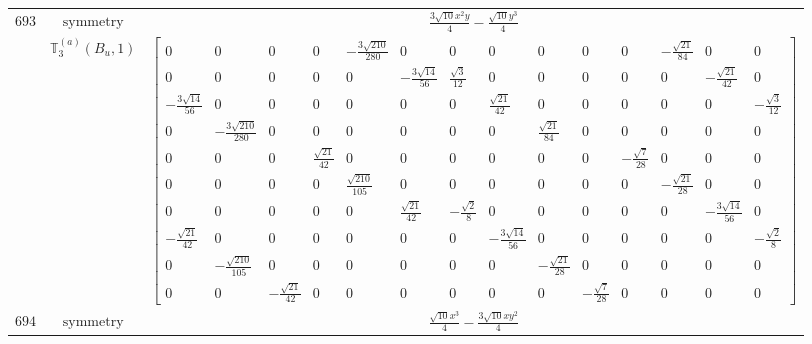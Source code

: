 \documentclass[fleqn,8pt,landscape]{jsarticle}
\begin{document}
\begin{longtable}{ccc}
$ 693 $ & $ \text{symmetry} $ & $ \frac{3 \sqrt{10} x^{2} y}{4} - \frac{\sqrt{10} y^{3}}{4} $ \\
$  $ & $ \mathbb{T}_{3}^{(a)}(B_{u},1) $ & $ \begin{bmatrix} 0 & 0 & 0 & 0 & - \frac{3 \sqrt{210}}{280} & 0 & 0 & 0 & 0 & 0 & 0 & - \frac{\sqrt{21}}{84} & 0 & 0 \\ 0 & 0 & 0 & 0 & 0 & - \frac{3 \sqrt{14}}{56} & \frac{\sqrt{3}}{12} & 0 & 0 & 0 & 0 & 0 & - \frac{\sqrt{21}}{42} & 0 \\ - \frac{3 \sqrt{14}}{56} & 0 & 0 & 0 & 0 & 0 & 0 & \frac{\sqrt{21}}{42} & 0 & 0 & 0 & 0 & 0 & - \frac{\sqrt{3}}{12} \\ 0 & - \frac{3 \sqrt{210}}{280} & 0 & 0 & 0 & 0 & 0 & 0 & \frac{\sqrt{21}}{84} & 0 & 0 & 0 & 0 & 0 \\ 0 & 0 & 0 & \frac{\sqrt{21}}{42} & 0 & 0 & 0 & 0 & 0 & 0 & - \frac{\sqrt{7}}{28} & 0 & 0 & 0 \\ 0 & 0 & 0 & 0 & \frac{\sqrt{210}}{105} & 0 & 0 & 0 & 0 & 0 & 0 & - \frac{\sqrt{21}}{28} & 0 & 0 \\ 0 & 0 & 0 & 0 & 0 & \frac{\sqrt{21}}{42} & - \frac{\sqrt{2}}{8} & 0 & 0 & 0 & 0 & 0 & - \frac{3 \sqrt{14}}{56} & 0 \\ - \frac{\sqrt{21}}{42} & 0 & 0 & 0 & 0 & 0 & 0 & - \frac{3 \sqrt{14}}{56} & 0 & 0 & 0 & 0 & 0 & - \frac{\sqrt{2}}{8} \\ 0 & - \frac{\sqrt{210}}{105} & 0 & 0 & 0 & 0 & 0 & 0 & - \frac{\sqrt{21}}{28} & 0 & 0 & 0 & 0 & 0 \\ 0 & 0 & - \frac{\sqrt{21}}{42} & 0 & 0 & 0 & 0 & 0 & 0 & - \frac{\sqrt{7}}{28} & 0 & 0 & 0 & 0 \end{bmatrix} $ \\ \hline
$ 694 $ & $ \text{symmetry} $ & $ \frac{\sqrt{10} x^{3}}{4} - \frac{3 \sqrt{10} x y^{2}}{4} $ \\

\end{longtable}
\end{document}
